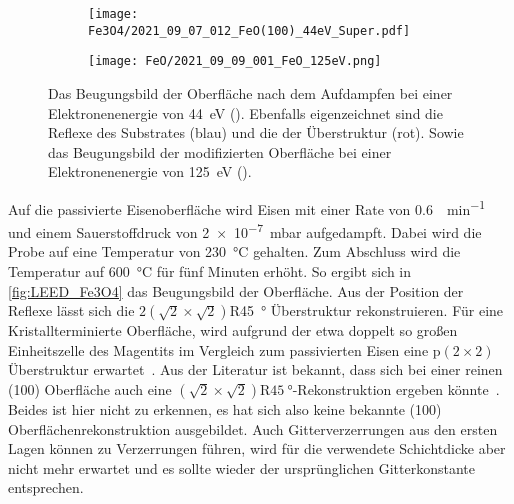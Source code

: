         \begin{figure}
            \begin{subfigure}[t]{0.48\textwidth}
                \centering
                \texttt{[image: Fe3O4/2021\_09\_07\_012\_FeO(100)\_44eV\_Super.pdf]}
                \subcaption{}
                \label{fig:LEED_Fe3O4}
            \end{subfigure}
            \begin{subfigure}[t]{0.48\textwidth}
                \centering
                \texttt{[image: FeO/2021\_09\_09\_001\_FeO\_125eV.png]}
                \subcaption{}
                \label{fig:LEED_FeO}
            \end{subfigure}
            \caption{Das Beugungsbild der Oberfläche nach dem Aufdampfen bei einer Elektronenenergie von \SI{44}{\electronvolt} ().
            Ebenfalls eigenzeichnet sind die Reflexe des Substrates (blau) und die der Überstruktur (rot).
            Sowie das Beugungsbild der modifizierten Oberfläche bei einer Elektronenenergie von \SI{125}{\electronvolt} ().}
        \end{figure}
        Auf die passivierte Eisenoberfläche wird Eisen mit einer Rate von \SI{0.6}{\ML\per\minute} und einem Sauerstoffdruck von \SI{2e-7}{\milli\bar} aufgedampft.
        Dabei wird die Probe auf eine Temperatur von \SI{230}{\celsius} gehalten.
        Zum Abschluss wird die Temperatur auf \SI{600}{\celsius} für fünf Minuten erhöht.
        So ergibt sich in \autoref{fig:LEED_Fe3O4} das Beugungsbild der Oberfläche.
        Aus der Position der Reflexe lässt sich die $2(\sqrt{2}\times\sqrt{2})$R\SI{45}{\degree} Überstruktur rekonstruieren.
        Für eine Kristallterminierte Oberfläche, wird aufgrund der etwa doppelt so großen Einheitszelle des Magentits im Vergleich zum passivierten Eisen eine p$(2\times2)$ Überstruktur erwartet~\cite{FeO_1}.
        Aus der Literatur ist bekannt, dass sich bei einer reinen (100) Oberfläche auch eine $(\sqrt{2}\times\sqrt{2})\text{R}\SI{45}{\degree}$-Rekonstruktion ergeben könnte~\cite{ruwisch_vsm-untersuchung_2016}.
        Beides ist hier nicht zu erkennen, es hat sich also keine bekannte (100) Oberflächenrekonstruktion ausgebildet.
        Auch Gitterverzerrungen aus den ersten Lagen können zu Verzerrungen führen, wird für die verwendete Schichtdicke aber nicht mehr erwartet und es sollte wieder der ursprünglichen Gitterkonstante entsprechen.

